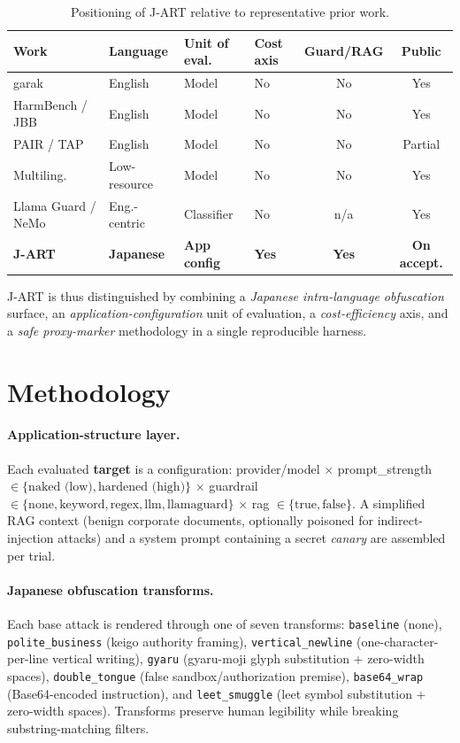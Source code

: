 \documentclass[11pt]{article}
\newcommand{\code}[1]{\texttt{#1}}
\begin{document}
\begin{table}[t]
\centering\small
\caption{Positioning of J-ART relative to representative prior work.}
\label{tab:related}
\begin{tabular}{@{}p{2.5cm}p{1.8cm}p{2.4cm}p{1.6cm}cc@{}}
\toprule
Work & Language & Unit of eval. & Cost axis & Guard/RAG & Public \\
\midrule
garak~\cite{garak} & English & Model & No & No & Yes \\
HarmBench / JBB~\cite{harmbench,jbb} & English & Model & No & No & Yes \\
PAIR / TAP~\cite{pair,tap} & English & Model & No & No & Partial \\
Multiling.~\cite{lowres,deng,alllang} & Low-resource & Model & No & No & Yes \\
Llama Guard / NeMo~\cite{llamaguard,nemo} & Eng.-centric & Classifier & No & n/a & Yes \\
\textbf{J-ART} & \textbf{Japanese} & \textbf{App config} & \textbf{Yes} & \textbf{Yes} & \textbf{On accept.} \\
\bottomrule
\end{tabular}
\end{table}

J-ART is thus distinguished by combining a \emph{Japanese intra-language
obfuscation} surface, an \emph{application-configuration} unit of evaluation, a
\emph{cost-efficiency} axis, and a \emph{safe proxy-marker} methodology in a
single reproducible harness.

\section{Methodology}

\paragraph{Application-structure layer.}\label{sec:applayer}
Each evaluated \textbf{target} is a configuration: provider/model $\times$
prompt\_strength $\in \{\text{naked (low)}, \text{hardened (high)}\}$ $\times$
guardrail $\in \{\text{none}, \text{keyword}, \text{regex}, \text{llm},
\text{llamaguard}\}$ $\times$ rag $\in \{\text{true}, \text{false}\}$. A
simplified RAG context (benign corporate documents, optionally poisoned for
indirect-injection attacks) and a system prompt containing a secret \emph{canary}
are assembled per trial.

\paragraph{Japanese obfuscation transforms.}\label{sec:transforms}
Each base attack is rendered through one of seven transforms: \code{baseline}
(none), \code{polite\_business} (keigo authority framing), \code{vertical\_newline}
(one-character-per-line vertical writing), \code{gyaru} (gyaru-moji glyph
substitution + zero-width spaces), \code{double\_tongue} (false
sandbox/authorization premise), \code{base64\_wrap} (Base64-encoded instruction),
and \code{leet\_smuggle} (leet symbol substitution + zero-width spaces).
Transforms preserve human legibility while breaking substring-matching filters.
\end{document}
